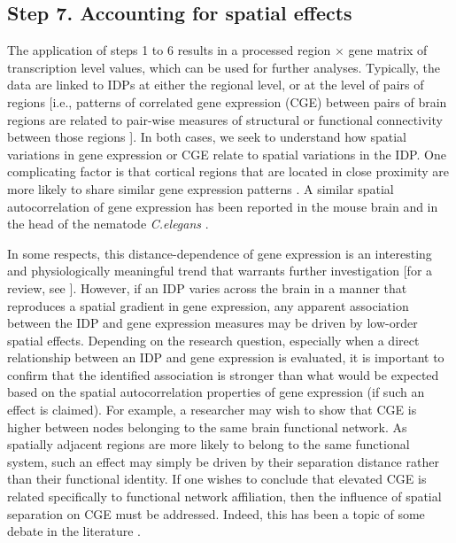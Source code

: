 \subsection{Step 7. Accounting for spatial effects}

The application of steps 1 to 6 results in a processed region $\times$ gene matrix of transcription level values, which can be used for further analyses. Typically, the data are linked to IDPs at either the regional level, or at the level of pairs of regions [i.e., patterns of correlated gene expression (CGE) between pairs of brain regions are related to pair-wise measures of structural or functional connectivity between those regions \citep{Fornito2019}]. In both cases, we seek to understand how spatial variations in gene expression or CGE relate to spatial variations in the IDP. One complicating factor is that cortical regions that are located in close proximity are more likely to share similar gene expression patterns \citep{Richiardi2015,Krienen2016,Vertes2016b,Pantazatos2017,Richiardi2017}. A similar spatial autocorrelation of gene expression has been reported in the mouse brain \citep{Fulcher2016} and in the head of the nematode \textit{C.elegans} \citep{Arnatkeviciute2018}.

In some respects, this distance-dependence of gene expression is an interesting and physiologically meaningful trend that warrants further investigation [for a review, see \citep{Fornito2019}]. However, if an IDP varies across the brain in a manner that reproduces a spatial gradient in gene expression, any apparent association between the IDP and gene expression measures may be driven by low-order spatial effects. Depending on the research question, especially when a direct relationship between an IDP and gene expression is evaluated, it is important to confirm that the identified association is stronger than what would be expected based on the spatial autocorrelation properties of gene expression (if such an effect is claimed). For example, a researcher may wish to show that CGE is higher between nodes belonging to the same brain functional network. As spatially adjacent regions are more likely to belong to the same functional system, such an effect may simply be driven by their separation distance rather than their functional identity. If one wishes to conclude that elevated CGE is related specifically to functional network affiliation, then the influence of spatial separation on CGE must be addressed. Indeed, this has been a topic of some debate in the literature \citep{Richiardi2015,Pantazatos2017,Richiardi2017}.

